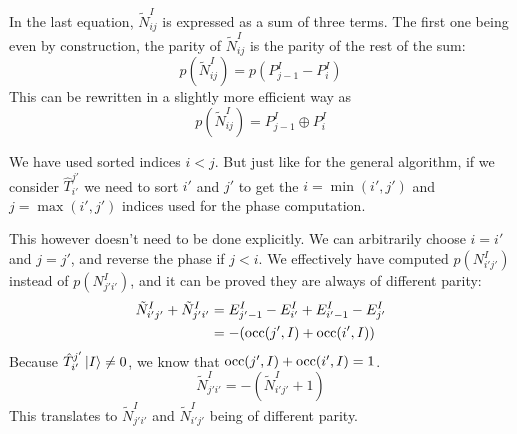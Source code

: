 \documentclass[./thesis.tex]{subfiles}
\begin{document}
In the last equation, $\tilde N^I_{ij}$ is expressed as a sum of three terms. The first one being even by construction, the parity of $\tilde N^I_{ij}$ is the parity of the rest of the sum:
\begin{equation}
p(\tilde N^I_{ij})=p(P^I_{j-1} - P^I_{i})
\end{equation}
This can be rewritten in a slightly more efficient way as
\begin{equation}
p(\tilde N^I_{ij}) = P^I_{j-1} \oplus P^I_{i}
\end{equation}


We have used sorted indices $i<j$. But just like for the general algorithm, if we consider $\hat T_{i'}^{j'}$ we need to sort $i'$ and $j'$ to get the $i=\min(i', j')$ and $j=\max(i', j')$ indices used for the phase computation.

This however doesn't need to be done explicitly. We can arbitrarily choose $i=i'$ and $j=j'$, and reverse the phase if $j<i$. We effectively have computed $p(N^I_{i'j'})$ instead of $p(N^I_{j'i'})$, and it can be proved they are always of different parity:
\begin{align}
\tilde N^{I}_{i' j'} + \tilde N^{I}_{j'i'} & = E^{I}_{j'-1} - E^I_{i'} + E^I_{i'-1} - E^I_{j'} \\
& = -\qty( {\text{occ}(j',I)} + {\text{occ}(i',I)})
\end{align}
Because $\hat T_{i'}^{j'} \ket I \neq 0$, we know that ${\text{occ}(j',I)} + {\text{occ}(i',I)} = 1$. 
\begin{equation}
\tilde N^{I}_{j' i'} = -(\tilde N^{I}_{i'j'} + 1)
\end{equation}
This translates to $\tilde N^{I}_{j' i'}$ and $\tilde N^{I}_{i'j'}$ being of different parity.
\end{document}
